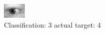 \begin{figure}[h!]
\begin{center}
\includegraphics[width=0.60\columnwidth]{figures/ID744_class_3_target_4.png}
\end{center}
\caption{ Classification: 3 actual target: 4}
\label{fig:ID744_class_3_target_4}
\end{figure}
